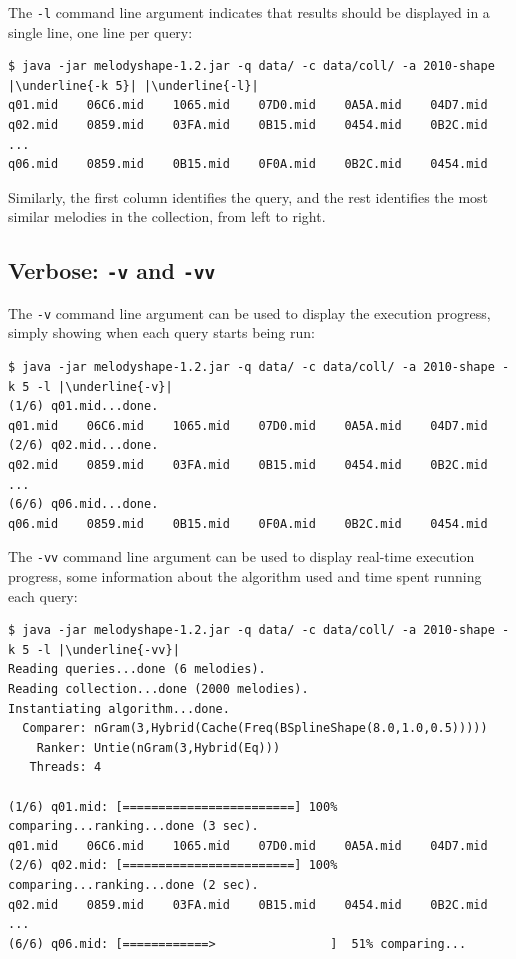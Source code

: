 \documentclass[twoside]{article}
\begin{document}
The \texttt{-l} command line argument indicates that results should be displayed in a single line, one line per query:
\begin{lstlisting}
$ java -jar melodyshape-1.2.jar -q data/ -c data/coll/ -a 2010-shape |\underline{-k 5}| |\underline{-l}|
q01.mid    06C6.mid    1065.mid    07D0.mid    0A5A.mid    04D7.mid
q02.mid    0859.mid    03FA.mid    0B15.mid    0454.mid    0B2C.mid
...
q06.mid    0859.mid    0B15.mid    0F0A.mid    0B2C.mid    0454.mid
\end{lstlisting}

Similarly, the first column identifies the query, and the rest identifies the most similar melodies in the collection, from left to right.

\subsection{Verbose: \texttt{-v} and \texttt{-vv}}

The \texttt{-v} command line argument can be used to display the execution progress, simply showing when each query starts being run:
\begin{lstlisting}
$ java -jar melodyshape-1.2.jar -q data/ -c data/coll/ -a 2010-shape -k 5 -l |\underline{-v}|
(1/6) q01.mid...done.
q01.mid    06C6.mid    1065.mid    07D0.mid    0A5A.mid    04D7.mid
(2/6) q02.mid...done.
q02.mid    0859.mid    03FA.mid    0B15.mid    0454.mid    0B2C.mid
...
(6/6) q06.mid...done.
q06.mid    0859.mid    0B15.mid    0F0A.mid    0B2C.mid    0454.mid
\end{lstlisting}

The \texttt{-vv} command line argument can be used to display real-time execution progress, some information about the algorithm used and time spent running each query:
\begin{lstlisting}
$ java -jar melodyshape-1.2.jar -q data/ -c data/coll/ -a 2010-shape -k 5 -l |\underline{-vv}|
Reading queries...done (6 melodies).
Reading collection...done (2000 melodies).
Instantiating algorithm...done.
  Comparer: nGram(3,Hybrid(Cache(Freq(BSplineShape(8.0,1.0,0.5)))))
    Ranker: Untie(nGram(3,Hybrid(Eq)))
   Threads: 4
 
(1/6) q01.mid: [========================] 100% comparing...ranking...done (3 sec).
q01.mid    06C6.mid    1065.mid    07D0.mid    0A5A.mid    04D7.mid
(2/6) q02.mid: [========================] 100% comparing...ranking...done (2 sec).
q02.mid    0859.mid    03FA.mid    0B15.mid    0454.mid    0B2C.mid
...
(6/6) q06.mid: [============>                ]  51% comparing...
\end{lstlisting}
\end{document}
